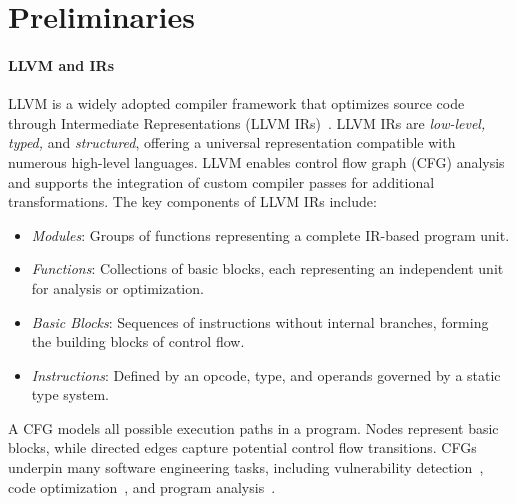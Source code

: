 \section{Preliminaries}
\paragraph{LLVM and IRs}
LLVM is a widely adopted compiler framework that optimizes source code through Intermediate Representations (LLVM IRs)~\cite{llvm}. LLVM IRs are \emph{low-level, typed,} and \emph{structured}, offering a universal representation compatible with numerous high-level languages. LLVM enables control flow graph (CFG) analysis and supports the integration of custom compiler passes for additional transformations. The key components of LLVM IRs include:
\begin{itemize}[nolistsep,leftmargin=*]
    \item \emph{Modules}: Groups of functions representing a complete IR-based program unit.
    \item \emph{Functions}: Collections of basic blocks, each representing an independent unit for analysis or optimization.
    \item \emph{Basic Blocks}: Sequences of instructions without internal branches, forming the building blocks of control flow.
    \item \emph{Instructions}: Defined by an opcode, type, and operands governed by a static type system.   
\end{itemize}

A CFG models all possible execution paths in a program. Nodes represent basic blocks, while directed edges capture potential control flow transitions. CFGs underpin many software engineering tasks, including vulnerability detection~\cite{zhou2019method,anju2010malware}, code optimization~\cite{mcconnell1993tree}, and program analysis~\cite{fechete2008framework}. 


